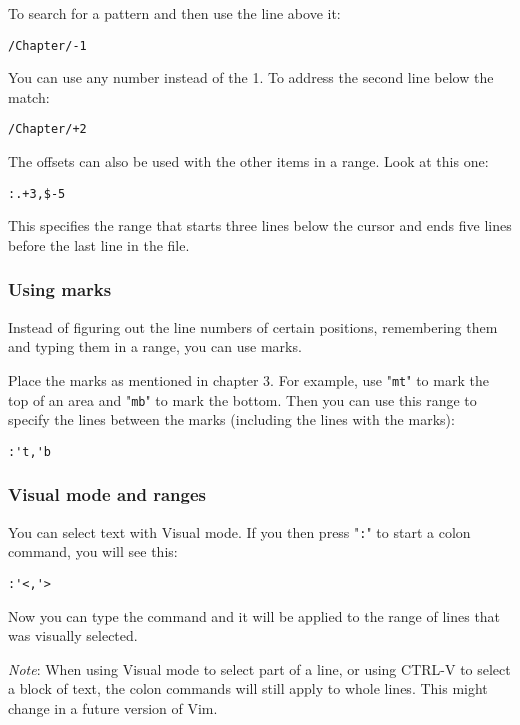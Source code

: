 {{To search for a pattern and then use the line above it:

\begin{Verbatim}[samepage=true]
 /Chapter/-1
\end{Verbatim}

You can use any number instead of the 1.
To address the second line below the match:

\begin{Verbatim}[samepage=true]
 /Chapter/+2
\end{Verbatim}

The offsets can also be used with the other items in a range.
Look at this one:

\begin{Verbatim}[samepage=true]
 :.+3,$-5
\end{Verbatim}

This specifies the range that starts three lines below the cursor and ends five lines before the last line in the file.
\subsubsection{Using marks}
Instead of figuring out the line numbers of certain positions, remembering them and typing them in a range, you can use marks.

Place the marks as mentioned in chapter 3.
For example, use "\texttt{mt}" to mark the top of an area and "\texttt{mb}" to mark the bottom.
Then you can use this range to specify the lines between the marks (including the lines with the marks):

\begin{Verbatim}[samepage=true]
 :'t,'b
\end{Verbatim}
\subsubsection{Visual mode and ranges}
You can select text with Visual mode.
If you then press "\texttt{:}" to start a colon command, you will see this:

\begin{Verbatim}[samepage=true]
 :'<,'>
\end{Verbatim}

Now you can type the command and it will be applied to the range of lines that was visually selected.

\emph{Note}:
When using Visual mode to select part of a line, or using CTRL-V to select a block of text, the colon commands will still apply to whole lines.
This might change in a future version of Vim.

}}
